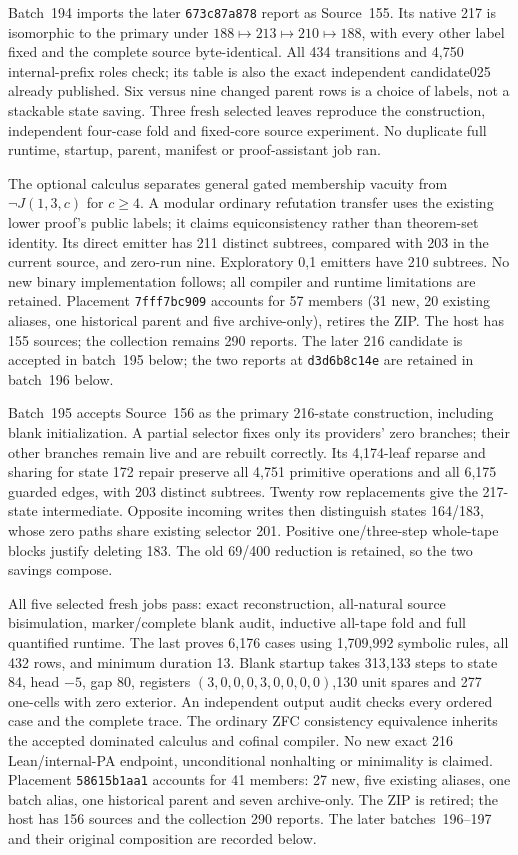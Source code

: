\documentclass[11pt]{article}
\begin{document}
{Batch~194 imports the later \texttt{673c87a878} report as Source~155. Its
native 217 is isomorphic to the primary under $188\mapsto213\mapsto210\mapsto188$,
with every other label fixed and the complete source byte-identical. All 434
transitions and 4,750 internal-prefix roles check; its table is also the exact
independent candidate025 already published. Six versus nine changed parent
rows is a choice of labels, not a stackable state saving. Three fresh selected
leaves reproduce the construction, independent four-case fold and fixed-core
source experiment. No duplicate full runtime, startup, parent, manifest or
proof-assistant job ran.

The optional calculus separates general gated membership vacuity from
$\neg J(1,3,c)$ for $c\ge4$. A modular ordinary refutation transfer uses the
existing lower proof's public labels; it claims equiconsistency rather than
theorem-set identity. Its direct emitter has 211 distinct subtrees, compared
with 203 in the current source, and zero-run nine. Exploratory 0,1 emitters have
210 subtrees. No new binary implementation follows; all compiler and runtime
limitations are retained. Placement \texttt{7fff7bc909} accounts for 57 members
(31 new, 20 existing aliases, one historical parent and five archive-only),
retires the ZIP. The host has 155 sources; the collection remains 290 reports.
The later 216 candidate is accepted in batch~195 below; the two reports
at \texttt{d3d6b8c14e} are retained in batch~196 below.

Batch~195 accepts Source~156 as the primary 216-state construction, including
blank initialization. A partial selector fixes only its providers' zero
branches; their other branches remain live and are rebuilt correctly. Its
4,174-leaf reparse and sharing for state 172 repair preserve all 4,751 primitive
operations and all 6,175 guarded edges, with 203 distinct subtrees. Twenty
row replacements give the 217-state intermediate. Opposite incoming writes
then distinguish states 164/183, whose zero paths share existing selector 201.
Positive one/three-step whole-tape blocks justify deleting 183. The old 69/400
reduction is retained, so the two savings compose.

All five selected fresh jobs pass: exact reconstruction, all-natural source
bisimulation, marker/complete blank audit, inductive all-tape fold and full
quantified runtime. The last proves 6,176 cases using 1,709,992 symbolic rules,
all 432 rows, and minimum duration 13. Blank startup takes 313,133 steps to
state 84, head $-5$, gap 80, registers $(3,0,0,0,3,0,0,0,0)$,130 unit spares
and 277 one-cells with zero exterior. An independent output audit checks every
ordered case and the complete trace. The ordinary ZFC consistency equivalence
inherits the accepted dominated calculus and cofinal compiler. No new
exact 216 Lean/internal-PA endpoint, unconditional nonhalting or minimality is
claimed. Placement \texttt{58615b1aa1} accounts for 41 members: 27 new, five
existing aliases, one batch alias, one historical parent and seven archive-only.
The ZIP is retired; the host has 156 sources and the collection 290 reports.
The later batches~196--197 and their original composition are recorded below.

}
\end{document}
